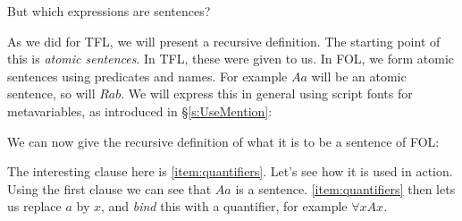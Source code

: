But which expressions are sentences?

As we did for TFL, we will  present a recursive definition. The starting point of this is \emph{atomic sentences}. In TFL, these were given to us. In FOL, we form atomic sentences using predicates and names. For example $Aa$ will be an atomic sentence, so will $Rab$. We will express this in general using script fonts for metavariables, as introduced in  \S\ref{s:UseMention}:

We can now give the recursive definition of what it is to be a sentence of FOL: 
	
	The interesting clause here is \ref{item:quantifiers}. Let's see how it is used in action. Using the first clause we can see that $Aa$ is a sentence. \ref{item:quantifiers} then lets us replace $a$ by $x$, and \emph{bind} this with a quantifier, for example $\forall x Ax$. 
	
